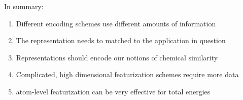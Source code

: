 In summary:
\vspace{1cm}
\pause{}
\begin{enumerate}
	\item Different encoding schemes use different amounts of information \pause{}
	\item The representation needs to matched to the application in question \pause{}
	\item Representations should encode our notions of chemical similarity \pause{}
	\item Complicated, high dimensional featurization schemes require more data \pause{}
	\item atom-level featurization can be very effective for total energies 
\end{enumerate}
